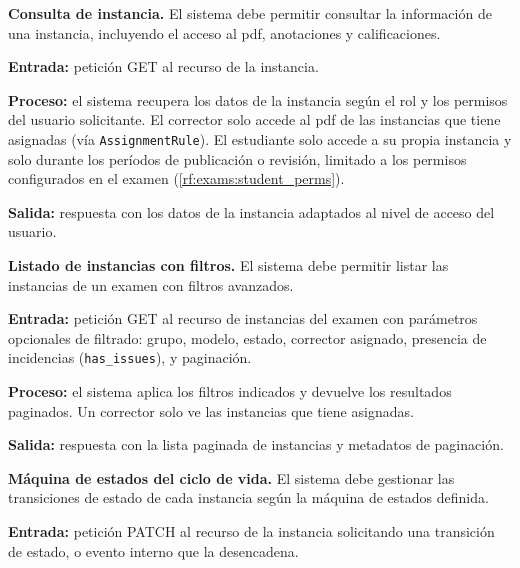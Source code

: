 \begin{functional}
    \item \textbf{Consulta de instancia.} \label{rf:instances:detail}
    El sistema debe permitir consultar la información de una instancia, incluyendo el acceso
    al \acs{pdf}, anotaciones y calificaciones.

    \textbf{Entrada:} petición GET al recurso de la instancia.

    \textbf{Proceso:} el sistema recupera los datos de la instancia según el rol y los
    permisos del usuario solicitante. El corrector solo accede al \acs{pdf} de las
    instancias que tiene asignadas (vía \texttt{AssignmentRule}). El estudiante solo accede
    a su propia instancia y solo durante los períodos de publicación o revisión, limitado a
    los permisos configurados en el examen (\cref{rf:exams:student_perms}).

    \textbf{Salida:} respuesta con los datos de la instancia adaptados al nivel de acceso
    del usuario.

    \item \textbf{Listado de instancias con filtros.} \label{rf:instances:list}
    El sistema debe permitir listar las instancias de un examen con filtros avanzados.

    \textbf{Entrada:} petición GET al recurso de instancias del examen con parámetros
    opcionales de filtrado: grupo, modelo, estado, corrector asignado, presencia de
    incidencias (\texttt{has\_issues}), y paginación.

    \textbf{Proceso:} el sistema aplica los filtros indicados y devuelve los resultados
    paginados. Un corrector solo ve las instancias que tiene asignadas.

    \textbf{Salida:} respuesta con la lista paginada de instancias y metadatos de
    paginación.

    \item \textbf{Máquina de estados del ciclo de vida.} \label{rf:instances:fsm}
    El sistema debe gestionar las transiciones de estado de cada instancia según la máquina
    de estados definida.

    \textbf{Entrada:} petición PATCH al recurso de la instancia solicitando una transición
    de estado, o evento interno que la desencadena.


\end{functional}
